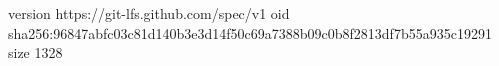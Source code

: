 version https://git-lfs.github.com/spec/v1
oid sha256:96847abfc03c81d140b3e3d14f50c69a7388b09c0b8f2813df7b55a935c19291
size 1328
